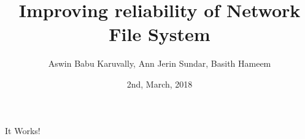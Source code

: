 \documentclass {article}
\title {Improving reliability of Network File System}
\author {Aswin Babu Karuvally, Ann Jerin Sundar, Basith Hameem}
\date {2nd, March, 2018}
\begin{document}
    \maketitle
    It Works!
\end{document}
